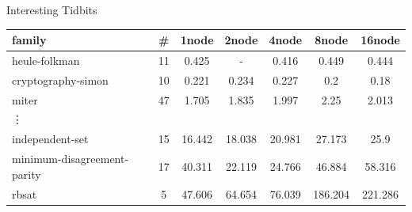\documentclass[]{sdqbeamer}
\begin{document}
\begin{frame}{Interesting Tidbits}
    \centering
    \begin{table}[!h]
        \center
        \begin{tabular}{ lcccccc }
            \toprule
            family	&	\#	&	1node	&	2node	&	4node	&	8node	&	16node\\
            \midrule
            heule-folkman	&	11	&	0.425	&	-	&	0.416	&	0.449	&	0.444\\
            cryptography-simon	&	10	&	0.221	&	0.234	&	0.227	&	0.2	&	0.18\\
            miter	&	47	&	1.705	&	1.835	&	1.997	&	2.25	&	2.013\\
            \vdots &&&&&&\\
            independent-set	&	15	&	16.442	&	18.038	&	20.981	&	27.173	&	25.9\\
            minimum-disagreement-parity	&	17	&	40.311	&	22.119	&	24.766	&	46.884	&	58.316\\
            rbsat	&	5	&	47.606	&	64.654	&	76.039	&	186.204	&	221.286\\
            \bottomrule
        \end{tabular}
    \end{table}
    \vfill
\end{frame}
\end{document}
